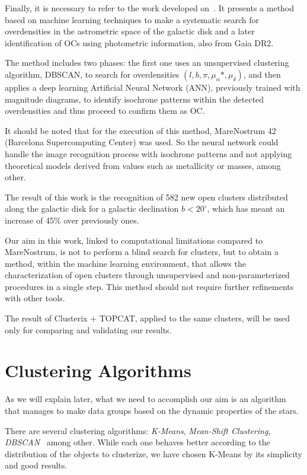 \documentclass[11pt, a4paper, english]{book}
\begin{document}
Finally, it is necessary to refer to the work developed on~\cite{castro2020hunting}.
It presents a method based on machine learning techniques to make a systematic search
for overdensities in the astrometric space of the galactic disk
and a later identification of OCs using photometric information, also from Gaia DR2.

The method includes two phases: the first one uses an unsupervised clustering algorithm, DBSCAN,
to search for overdensities \((l, b, \pi, \mu_{\alpha} *, \mu_{\delta})\),
and then applies a deep learning Artificial Neural Network (ANN),
previously trained with magnitude diagrams,
to identify isochrone patterns within the detected overdensities and thus proceed to confirm them as OC.

It should be noted that for the execution of this method,
MareNostrum 42 (Barcelona Supercomputing Center) was used.
So the neural network could handle the image recognition process with isochrone patterns
and not applying theoretical models derived from values such as metallicity or masses, among other.

The result of this work is the recognition of 582 new open clusters
distributed along the galactic disk for a galactic declination \(b < 20^{\circ}\),
which has meant an increase of 45\% over previously ones.

Our aim in this work, linked to computational limitations compared to MareNostrum,
is not to perform a blind search for clusters, but to obtain a method, within the machine learning environment,
that allows the characterization of open clusters through unsupervised and non-parameterized procedures in a single step.
This method should not require further refinements with other tools.

The result of Clusterix + TOPCAT, applied to the same clusters,
will be used only for comparing and validating our results.

\section{Clustering Algorithms}

As we will explain later, what we need to accomplish our aim is an algorithm
that manages to make data groups based on the dynamic properties of the stars.

There are several clustering algorithms: \emph{K-Means}, \emph{Mean-Shift Clustering}, \emph{DBSCAN}~\cite{ester1996density} among other.
While each one behaves better according to the distribution of the objects to clusterize,
we have chosen K-Means by its simplicity and good results.
\end{document}

